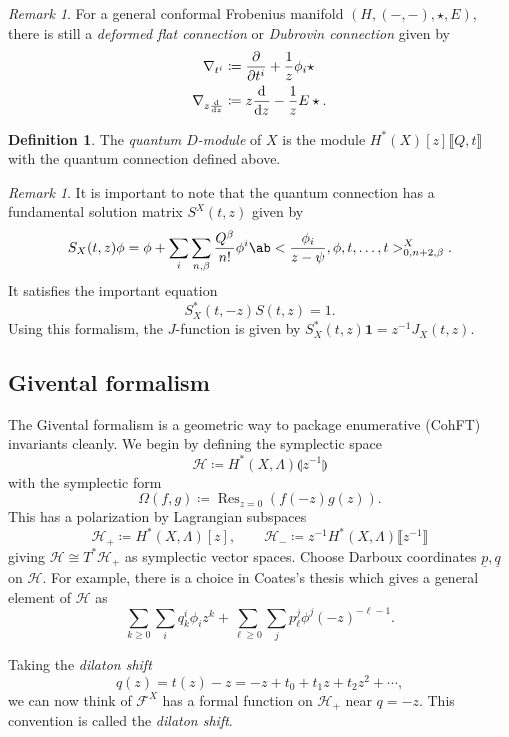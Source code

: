 \documentclass[leqno, openany]{memoir}
\theoremstyle{definition}
\newtheorem{defn}[thm]{Definition}
\theoremstyle{remark}
\newtheorem{rmk}[thm]{Remark}
\theoremstyle{plain}
\theoremstyle{definition}
\theoremstyle{remark}
\newcommand{\mc}[1]{\mathcal{#1}}
\newcommand{\mbf}[1]{\mathbf{#1}}
\newcommand{\on}[1]{\operatorname{#1}}
\newcommand{\ul}[1]{\underline{#1}}
\begin{document}
\begin{rmk}
    For a general conformal Frobenius manifold $(H, (-,-), \star, E)$, there is still a \textit{deformed flat connection} or \textit{Dubrovin connection} given by
    \begin{align*}
        \nabla_{t^i} &\coloneqq \pdv{}{t^i} + \frac{1}{z} \phi_i \star \\
        \nabla_{z \odv{}{z}} &\coloneqq z \odv{}{z} - \frac{1}{z} E \star.
    \end{align*}
\end{rmk}


\begin{defn}
    The \textit{quantum $D$-module} of $X$ is the module $H^*(X)[z]\llbracket Q,t\rrbracket$ with the quantum connection defined above.
\end{defn}

\begin{rmk}
    It is important to note that the quantum connection has a fundamental solution matrix $S^X(t,z)$ given by
    \[ S_X(t,z) \phi = \phi + \sum_{i} \sum_{n,\beta} \frac{Q^{\beta}}{n!} \phi^i \ab<\frac{\phi_i}{z-\psi},\phi,t,\ldots,t>_{0,n+2,\beta}^X. \]
    It satisfies the important equation
    \[ S_X^*(t,-z) S(t,z) = 1. \]
    Using this formalism, the $J$-function is given by $S_X^*(t,z) \mbf{1} = z^{-1} J_X(t,z)$.
\end{rmk}


\subsection{Givental formalism}

The Givental formalism is a geometric way to package enumerative (CohFT) invariants cleanly. We begin by defining the symplectic space
\[ \mc{H} \coloneqq H^*(X, \Lambda)\llparenthesis z^{-1}\rrparenthesis \]
with the symplectic form
\[ \Omega(f,g) \coloneqq \on{Res}_{z=0} ( f(-z)g(z) ). \]
This has a polarization by Lagrangian subspaces
\[ \mc{H}_+ \coloneqq H^*(X,\Lambda)[z], \qquad \mc{H}_- \coloneqq z^{-1} H^*(X,\Lambda)\llbracket z^{-1} \rrbracket \]
giving $\mc{H} \cong T^* \mc{H}_+$ as symplectic vector spaces. Choose Darboux coordinates $\ul{p}, \ul{q}$ on $\mc{H}$. For example, there is a choice in Coates's thesis which gives a general element of $\mc{H}$ as
\[ \sum_{k \geq 0} \sum_i q_k^i \phi_i z^k + \sum_{\ell \geq 0} \sum_j p_{\ell}^j \phi^j (-z)^{-\ell-1}. \]

Taking the \textit{dilaton shift}
\[ q(z) = t(z) - z = -z + t_0 + t_1 z + t_2 z^2 + \cdots, \]
we can now think of $\mc{F}^X$ has a formal function on $\mc{H}_+$ near $q = -z$. This convention is called the \textit{dilaton shift}.
\end{document}
